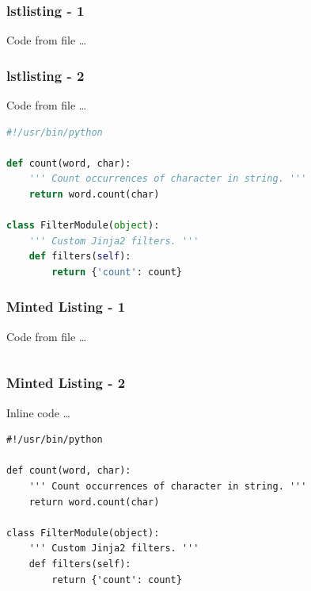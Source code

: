 \documentclass[pdf]{beamer}
\begin{document}
\begin{frame}
  \frametitle{lstlisting - 1}
  Code from file \ldots
  
\end{frame}

\begin{frame}[fragile]
  \frametitle{lstlisting - 2}
  Code from file \ldots
  \begin{lstlisting}[language=python]
#!/usr/bin/python

def count(word, char):
    ''' Count occurrences of character in string. '''
    return word.count(char)

class FilterModule(object):
    ''' Custom Jinja2 filters. '''
    def filters(self):
        return {'count': count}
  \end{lstlisting}
\end{frame}

\begin{frame}
  \frametitle{Minted Listing - 1}
  Code from file \ldots
  \inputminted{python}{example.py}
\end{frame}

\begin{frame}[fragile]
  \frametitle{Minted Listing - 2}
  Inline code \ldots
  \begin{verbatim}
#!/usr/bin/python

def count(word, char):
    ''' Count occurrences of character in string. '''
    return word.count(char)

class FilterModule(object):
    ''' Custom Jinja2 filters. '''
    def filters(self):
        return {'count': count}
  \end{verbatim}
\end{frame}
\end{document}
